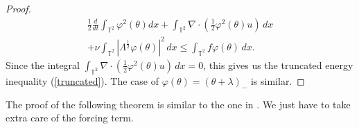 \documentclass{amsart}
\numberwithin{Theorem}{section}
\theoremstyle{definition}
\theoremstyle{remark}
\begin{document}
\begin{proof}
\begin{equation}\label{energy2}
\begin{split}
\frac{1}{2}\frac{d}{dt}\int_{\mathbb T^2}\varphi^2(\theta)dx+\int_{\mathbb T^2}\nabla\cdot\left(\frac{1}{2}\varphi^2(\theta)u\right)\, dx\\
+\nu\int_{\mathbb T^2}\left|\Lambda^{\frac{1}{2}}\varphi(\theta)\right|^2\, dx
\leq\int_{\mathbb T^2}f\varphi(\theta)\, dx.
\end{split}
\end{equation}
Since the integral $\int_{\mathbb T^2}\nabla\cdot\left(\frac{1}{2}\varphi^2(\theta)u\right)\, dx=0$,
this gives us the truncated energy inequality (\ref{truncated}). The case of $\varphi(\theta)=(\theta+\lambda)_-$ is similar.


\end{proof}

The proof of the following theorem is similar to the one in \cite{CaV}. We just have to take extra care of the forcing term.
\end{document}
